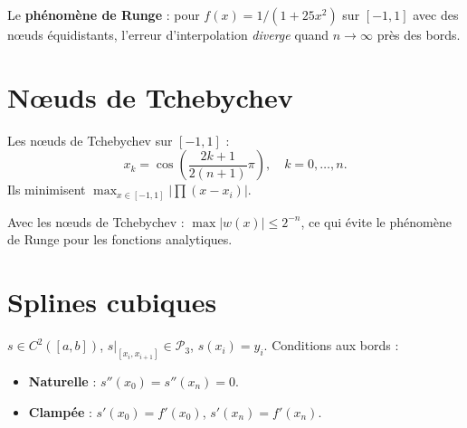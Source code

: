 \begin{attention}
Le \textbf{ph\'enom\`ene de Runge} : pour $f(x)=1/(1+25x^2)$ sur $[-1,1]$ avec des n\oe uds \'equidistants, l'erreur d'interpolation \emph{diverge} quand $n\to\infty$ pr\`es des bords.
\end{attention}

\begin{center}
\end{center}

\section{N\oe uds de Tchebychev}

\begin{definition}
Les n\oe uds de Tchebychev sur $[-1,1]$ :
\[
x_k = \cos\left(\frac{2k+1}{2(n+1)}\pi\right), \quad k=0,\ldots,n.
\]
Ils minimisent $\max_{x\in[-1,1]}|\prod(x-x_i)|$.
\end{definition}

\begin{theoreme}
Avec les n\oe uds de Tchebychev : $\max|w(x)|\leq 2^{-n}$, ce qui \'evite le ph\'enom\`ene de Runge pour les fonctions analytiques.
\end{theoreme}

\section{Splines cubiques}

\begin{definition}
$s\in C^2([a,b])$, $s|_{[x_i,x_{i+1}]}\in\mathcal{P}_3$, $s(x_i)=y_i$. Conditions aux bords :
\begin{itemize}
\item \textbf{Naturelle} : $s''(x_0)=s''(x_n)=0$.
\item \textbf{Clamp\'ee} : $s'(x_0)=f'(x_0)$, $s'(x_n)=f'(x_n)$.
\end{itemize}
\end{definition}

